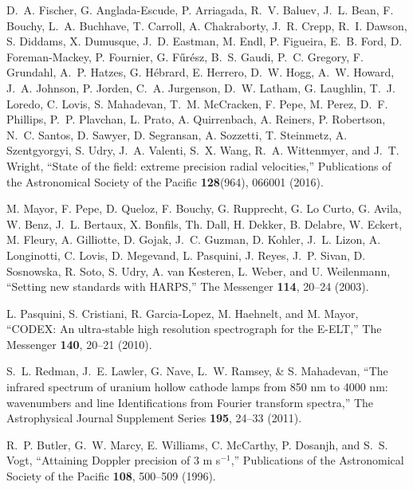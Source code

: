 \documentclass[10pt]{article}
\begin{document}


 \begin{thebibliography}{21}
 D.~A. Fischer, G. Anglada-Escude, P. Arriagada, R.~V. Baluev, J.~L. Bean, F.  Bouchy, L.~A. Buchhave, T. Carroll, A. Chakraborty, J.~R. Crepp, R.~I. Dawson, S. Diddams, X. Dumusque, J.~D. Eastman, M. Endl, P. Figueira, E.~B. Ford, D. Foreman-Mackey, P. Fournier, G. F{\H u}r{\'e}sz, B.~S. Gaudi, P.~C. Gregory, F. Grundahl, A.~P. Hatzes, G. H{\'e}brard, E. Herrero, D.~W. Hogg, A.~W. Howard, J.~A. Johnson, P. Jorden, C.~A. Jurgenson, D.~W. Latham, G. Laughlin, T.~J. Loredo, C. Lovis, S. Mahadevan, T.~M. McCracken, F. Pepe, M. Perez, D.~F. Phillips, P.~P. Plavchan, L. Prato, A. Quirrenbach, A. Reiners, P. Robertson, N.~C. Santos, D. Sawyer, D. Segransan, A. Sozzetti, T. Steinmetz, A. Szentgyorgyi, S. Udry, J.~A. Valenti, S.~X. Wang, R.~A. Wittenmyer, and J.~T. Wright, ``State of the field: extreme precision radial velocities,'' Publications of the Astronomical Society of the Pacific {\bf 128}(964), 066001 (2016).

  M. Mayor, F. Pepe, D. Queloz, F. Bouchy,
   G. Rupprecht, G. Lo Curto, G. Avila, W. Benz, J.~L. Bertaux, X. Bonfils, Th. Dall, H. Dekker, B. Delabre, W. Eckert, M. Fleury, A. Gilliotte, D. Gojak, J.~C. Guzman, D. Kohler, J.~L. Lizon, A. Longinotti, C. Lovis, D. Megevand, L. Pasquini, J. Reyes, J.~P. Sivan, D. Sosnowska, R. Soto, S. Udry, A. van Kesteren, L. Weber, and U. Weilenmann, ``Setting new standards with HARPS,'' The Messenger {\bf 114}, 20--24 (2003).
   
  L. Pasquini, S. Cristiani, R. Garcia-Lopez,
   M. Haehnelt, and M. Mayor, ``CODEX: An ultra-stable high resolution spectrograph for the E-ELT,'' The Messenger {\bf 140}, 20--21 (2010).

  S.~L. Redman, J.~E. Lawler, G. Nave, L.~W. Ramsey, \&
   S. Mahadevan, ``The infrared spectrum of uranium hollow cathode lamps from 850 nm to 4000 nm: wavenumbers and line Identifications from Fourier transform spectra,'' The Astrophysical Journal Supplement Series {\bf 195}, 24--33 (2011).
   
 R.~P. Butler, G.~W. Marcy, E. Williams, C. McCarthy, P. Dosanjh,
   and S.~S. Vogt, ``Attaining Doppler precision of 3 m s$^{-1}$,'' Publications of the Astronomical Society of the Pacific {\bf 108}, 500--509 (1996).


\end{thebibliography}
\end{document}
